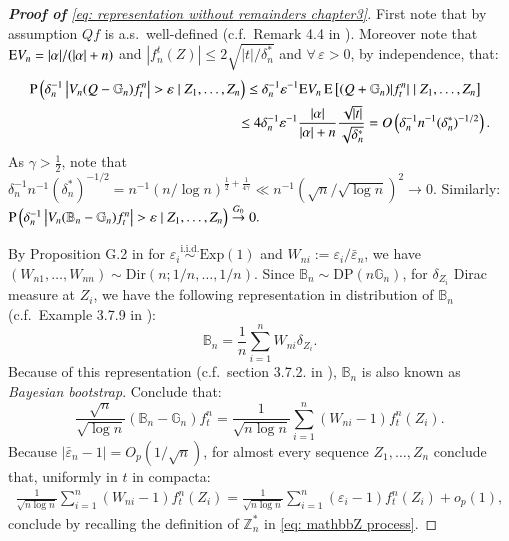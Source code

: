 	\begin{proof}[\hypertarget{proof of reduction}{\textbf{Proof of}} \eqref{eq: representation without remainders chapter3}]
		First note that by assumption $Qf$ is a.s.\ well-defined (c.f.\ Remark 4.4 in \cite{4}). Moreover note that \( \mathrm{E} V_n = |\alpha|/(|\alpha| + n) \) and $|f_n^t(Z)| \leq 2 \sqrt{|t|/ \delta^*_n}$ and \( \forall \, \varepsilon > 0 \), by independence, that:
	\begin{align*}
	\pb \left( \delta_n^{-1} \left| V_n (Q - \mathbb{G}_n) f_t^n \right| > \varepsilon \mid Z_1, \ldots, Z_n \right) &\leq \delta_n^{-1} \varepsilon^{-1} \ex V_n \, \ex \left[  (Q + \mathbb{G}_n) | f_t^n | \mid Z_1, \ldots, Z_n \right] \\
	&\hspace{-0.2cm}\leq 4 \delta_n^{-1} \varepsilon^{-1} \frac{|\alpha|}{|\alpha| + n} \frac{\sqrt{|t|}}{\sqrt{\delta^*_n}}= O\left(\delta^{-1}_n n^{-1} (\delta^{*}_n)^{-1/2} \right).
	\end{align*}
	As $\gamma > \frac{1}{2}$, note that $\delta^{-1}_n n^{-1} (\delta^{*}_n)^{-1/2} = n^{-1} (n / \log{n})^{\frac{1}{2} + \frac{1}{4 \gamma}} \ll  n^{-1} (\sqrt{n}/ \sqrt{\log{n}})^2  \rightarrow 0$. Similarly: $\mathrm{P} \left( \delta_n^{-1} \left| V_n (\mathbb{B}_n - \mathbb{G}_n) f_t^n \right| > \varepsilon \mid Z_1, \dots, Z_n \right) \stackrel{G_0}{\rightarrow} 0.$



	By Proposition G.2 in \cite{4} for \( \varepsilon_i \overset{\text{i.i.d.}}{\sim} \text{Exp}(1) \) and \( W_{ni} := \varepsilon_i / \bar{\varepsilon}_n \), we have \( (W_{n1}, \ldots, W_{nn}) \sim \text{Dir}(n; 1/n, \dots, 1/n) \). Since \( \mathbb{B}_n \sim \text{DP}(n \mathbb{G}_n) \), for $\delta_{Z_i}$ Dirac measure at $Z_i$, we have the following representation in distribution of $\mathbb{B}_n$ (c.f.\ Example 3.7.9 in \cite{5}):
	\[
	\mathbb{B}_n = \frac{1}{n} \sum_{i=1}^n W_{ni} \delta_{Z_i}.
	\]
	Because of this representation (c.f.\ section 3.7.2. in \cite{5}), $\mathbb{B}_n$ is also known as \textit{Bayesian bootstrap}. Conclude that: 
	\[
		\frac{\sqrt{n}}{\sqrt{\log n}} (\mathbb{B}_n - \mathbb{G}_n) f^n_t = \frac{1}{\sqrt{n \log n}} \sum_{i=1}^n \left( W_{ni} - 1 \right) f^n_t(Z_i).
	\]
	Because $|\bar{\varepsilon}_n - 1| = O_p(1/\sqrt{n})$, for almost every sequence $Z_1,\ldots, Z_n$ conclude that, uniformly in $t$ in compacta: 
	\begin{align}\label{eq: process representation}
		\frac{1}{\sqrt{n \log n}} \sum_{i=1}^n \left( W_{ni} - 1 \right) f_t^n(Z_i)=\frac{1}{\sqrt{n \log n}} \sum_{i=1}^n \left( \varepsilon_i - 1 \right) f_t^n(Z_i) + o_p(1),
	\end{align}
	conclude by recalling the definition of $\mathbb{Z}^*_n$ in \eqref{eq: mathbbZ process}.
	\end{proof}

